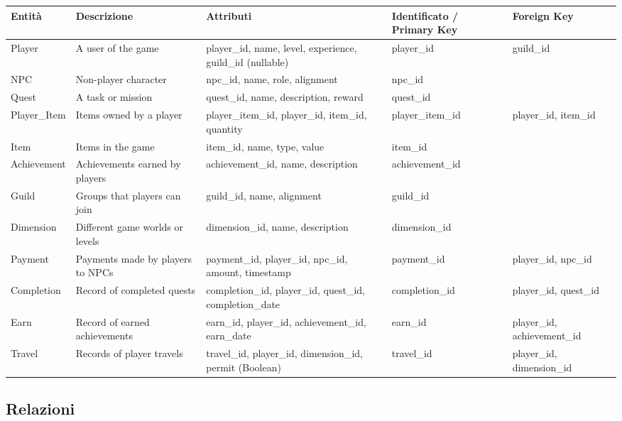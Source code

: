 \documentclass{article}
\begin{document}
\begin{longtable}{ | l | p{6cm} | p{6cm} | l | l | }
    \hline
    \textbf{Entità} & \textbf{Descrizione} & \textbf{Attributi} & \textbf{Identificato / Primary Key} & \textbf{Foreign Key} \\
    \hline
    Player & A user of the game & player\_id, name, level, experience, guild\_id (nullable) & player\_id & guild\_id \\
    \hline
    NPC & Non-player character & npc\_id, name, role, alignment & npc\_id & \\
    \hline
    Quest & A task or mission & quest\_id, name, description, reward & quest\_id & \\
    \hline
    Player\_Item & Items owned by a player & player\_item\_id, player\_id, item\_id, quantity & player\_item\_id & player\_id, item\_id \\
    \hline
    Item & Items in the game & item\_id, name, type, value & item\_id & \\
    \hline
    Achievement & Achievements earned by players & achievement\_id, name, description & achievement\_id & \\
    \hline
    Guild & Groups that players can join & guild\_id, name, alignment & guild\_id & \\
    \hline
    Dimension & Different game worlds or levels & dimension\_id, name, description & dimension\_id & \\
    \hline
    Payment & Payments made by players to NPCs & payment\_id, player\_id, npc\_id, amount, timestamp & payment\_id & player\_id, npc\_id \\
    \hline
    Completion & Record of completed quests & completion\_id, player\_id, quest\_id, completion\_date & completion\_id & player\_id, quest\_id \\
    \hline
    Earn & Record of earned achievements & earn\_id, player\_id, achievement\_id, earn\_date & earn\_id & player\_id, achievement\_id \\
    \hline
    Travel & Records of player travels & travel\_id, player\_id, dimension\_id, permit (Boolean) & travel\_id & player\_id, dimension\_id \\
    \hline
\end{longtable}


\subsection{Relazioni}
\end{document}
